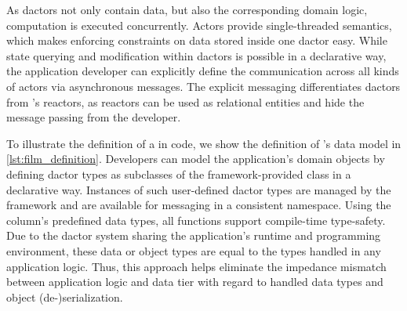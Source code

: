     As \glspl{dactor} not only contain data, but also the corresponding domain logic, computation is executed concurrently.
    Actors provide single-threaded semantics, which makes enforcing constraints on data stored inside one \gls{dactor} easy.
    While state querying and modification within \glspl{dactor} is possible in a declarative way, the application developer can explicitly define the communication across all kinds of actors via asynchronous messages.
    The explicit messaging differentiates \glspl{dactor} from \citet{Shah:reactdb}'s reactors, as reactors can be used as relational entities and hide the message passing from the developer.
    
    To illustrate the definition of a  in code, we show the definition of 's data model in \cref{lst:film_definition}.
    Developers can model the application's domain objects by defining \gls{dactor} types as subclasses of the framework-provided  class in a declarative way.
    Instances of such user-defined \gls{dactor} types are managed by the framework and are available for messaging in a consistent namespace.
    Using the column's predefined data types, all functions support compile-time type-safety.
    Due to the \gls{dactor} system sharing the application's runtime and programming environment, these data or object types are equal to the types handled in any application logic.
    Thus, this approach helps eliminate the impedance mismatch between application logic and data tier with regard to handled data types and object (de-)serialization.

